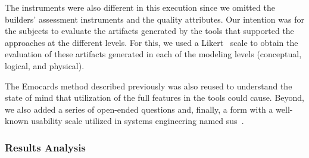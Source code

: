 The instruments were also different in this execution since we omitted the builders' assessment instruments and the quality attributes.
Our intention was for the subjects to evaluate the artifacts generated by the tools that supported the approaches at the different levels.
For this, we used a Likert~\cite{Likert} scale to obtain the evaluation of these artifacts generated in each of the modeling levels (conceptual, logical, and physical).

The Emocards method described previously was also reused to understand the state of mind that utilization of the full features in the tools could cause.
Beyond, we also added a series of open-ended questions and, finally, a form with a well-known usability scale utilized in systems engineering named \ac{sus}~\cite{sus:1995}.
 
\subsubsection{Results Analysis}

